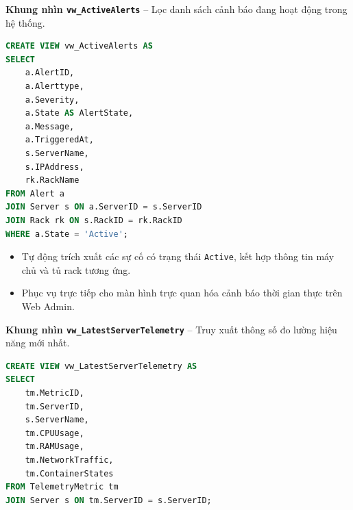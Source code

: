\vspace{0.5em}
\noindent\textbf{Khung nhìn \texttt{vw\_ActiveAlerts}} -- Lọc danh sách cảnh báo đang hoạt động trong hệ thống.

\begin{tcolorbox}[colback=gray!5, colframe=gray!60, title={\textbf{CREATE VIEW vw\_ActiveAlerts}}, fonttitle=\bfseries\small, boxrule=0.5pt, arc=2pt]
\begin{lstlisting}[language=SQL, basicstyle=\ttfamily\small, breaklines=true, showstringspaces=false, keywordstyle=\bfseries\color{blue!70!black}, stringstyle=\color{red!70!black}, commentstyle=\itshape\color{green!50!black}]
CREATE VIEW vw_ActiveAlerts AS
SELECT 
    a.AlertID,
    a.Alerttype,
    a.Severity,
    a.State AS AlertState,
    a.Message,
    a.TriggeredAt,
    s.ServerName,
    s.IPAddress,
    rk.RackName
FROM Alert a
JOIN Server s ON a.ServerID = s.ServerID
JOIN Rack rk ON s.RackID = rk.RackID
WHERE a.State = 'Active';
\end{lstlisting}
\end{tcolorbox}

\begin{itemize}[leftmargin=2em]
    \item Tự động trích xuất các sự cố có trạng thái \texttt{Active}, kết hợp thông tin máy chủ và tủ rack tương ứng.
    \item Phục vụ trực tiếp cho màn hình trực quan hóa cảnh báo thời gian thực trên Web Admin.
\end{itemize}

\vspace{0.5em}
\noindent\textbf{Khung nhìn \texttt{vw\_LatestServerTelemetry}} -- Truy xuất thông số đo lường hiệu năng mới nhất.

\begin{tcolorbox}[colback=gray!5, colframe=gray!60, title={\textbf{CREATE VIEW vw\_LatestServerTelemetry}}, fonttitle=\bfseries\small, boxrule=0.5pt, arc=2pt]
\begin{lstlisting}[language=SQL, basicstyle=\ttfamily\small, breaklines=true, showstringspaces=false, keywordstyle=\bfseries\color{blue!70!black}, stringstyle=\color{red!70!black}, commentstyle=\itshape\color{green!50!black}]
CREATE VIEW vw_LatestServerTelemetry AS
SELECT 
    tm.MetricID,
    tm.ServerID,
    s.ServerName,
    tm.CPUUsage,
    tm.RAMUsage,
    tm.NetworkTraffic,
    tm.ContainerStates
FROM TelemetryMetric tm
JOIN Server s ON tm.ServerID = s.ServerID;
\end{lstlisting}
\end{tcolorbox}

